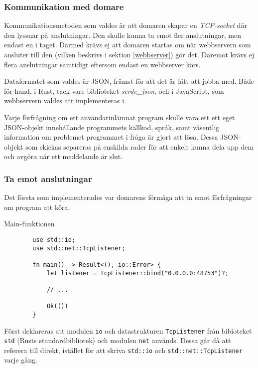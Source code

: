 \documentclass{article}
\begin{document}
\subsubsection{Kommunikation med domare}

Kommunikationsmetoden som valdes är att domaren skapar en \textit{TCP-socket}
där den lyssnar på anslutningar. Den skulle kunna ta emot fler anslutningar, men
endast en i taget. Därmed krävs ej att domaren startas om när webbservern som
ansluter till den (vilken beskrivs i sektion \ref{webbserver}) gör det. Däremot
krävs ej flera anslutningar samtidigt eftersom endast en webbserver körs.

Dataformatet som valdes är JSON, främst för att det är lätt att jobba med. Både
för hand, i Rust, tack vare biblioteket \textit{serde\_json}, och i JavaScript,
som webbservern valdes att implementeras i.

Varje förfrågning om ett användarinlämnat program skulle vara ett ett eget
JSON-objekt innehållande programmets källkod, språk, samt väsentlig information
om problemet programmet i fråga är gjort att lösa. Dessa JSON-objekt som skickas
separeras på enskilda rader för att enkelt kunna dela upp dem och avgöra när ett
meddelande är slut.

\subsubsection{Ta emot anslutningar}

Det första som implementerades var domarens förmåga att ta emot förfrågningar om
program att köra.

\begin{listing}[H]
	\caption{Main-funktionen}
	\begin{verbatim}
		use std::io;
		use std::net::TcpListener;

		fn main() -> Result<(), io::Error> {
			let listener = TcpListener::bind("0.0.0.0:48753")?;

			// ...

			Ok(())
		}
	\end{verbatim}
\end{listing}

Först deklareras att modulen \texttt{io} och datastrukturen
\texttt{TcpListener} från bibioteket \texttt{std} (Rusts standardbibliotek) och
modulen \texttt{net} används. Dessa går då att referera till
direkt, istället för att skriva \texttt{std::io} och
\texttt{std::net::TcpListener} varje gång.
\end{document}
